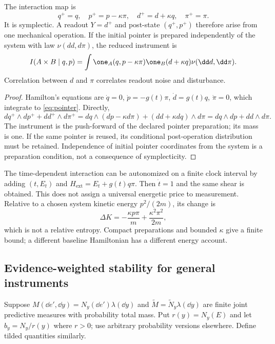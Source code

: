 \begin{proposition}\label{prop:pointer}
The interaction map is
\begin{equation}
 q^+=q,\quad p^+=p-\kappa\pi,\quad
 d^+=d+\kappa q,\quad \pi^+=\pi.
 \label{eq:pointer}
\end{equation}
It is symplectic. A readout $Y=d^+$ and post-state $(q^+,p^+)$ therefore arise from one mechanical operation. If the initial pointer is prepared independently of the system with law $\nu(dd,d\pi)$, the reduced instrument is
\[
 I(A\times B\mid q,p)
 =\int\one_A(q,p-\kappa\pi)\one_B(d+\kappa q)\nu(\dd d,\dd\pi).
\]
Correlation between $d$ and $\pi$ correlates readout noise and disturbance.
\end{proposition}
\begin{proof}
Hamilton's equations are $\dot q=0$, $\dot p=-g(t)\pi$, $\dot d=g(t)q$, $\dot\pi=0$, which integrate to \eqref{eq:pointer}. Directly,
\[
 dq^+\wedge dp^++dd^+\wedge d\pi^+
 =dq\wedge(dp-\kappa d\pi)+(dd+\kappa dq)\wedge d\pi
 =dq\wedge dp+dd\wedge d\pi.
\]
The instrument is the push-forward of the declared pointer preparation; its mass is one. If the same pointer is reused, its conditional post-operation distribution must be retained. Independence of initial pointer coordinates from the system is a preparation condition, not a consequence of symplecticity.
\end{proof}

The time-dependent interaction can be autonomized on a finite clock interval by adding $(t,E_t)$ and $H_{\mathrm{ext}}=E_t+g(t)q\pi$. Then $\dot t=1$ and the same shear is obtained. This does not assign a universal energetic price to measurement. Relative to a chosen system kinetic energy $p^2/(2m)$, its change is
\[
 \Delta K=-\frac{\kappa p\pi}{m}+\frac{\kappa^2\pi^2}{2m},
\]
which is not a relative entropy. Compact preparations and bounded $\kappa$ give a finite bound; a different baseline Hamiltonian has a different energy account.

\subsection{Evidence-weighted stability for general instruments}
Suppose $M(\dd e',\dd y)=N_y(\dd e')\lambda(\dd y)$ and
$\widetilde M=\widetilde N_y\lambda(\dd y)$ are finite joint predictive measures with probability total mass. Put $r(y)=N_y(E)$ and let $b_y=N_y/r(y)$ where $r>0$; use arbitrary probability versions elsewhere. Define tilded quantities similarly.


